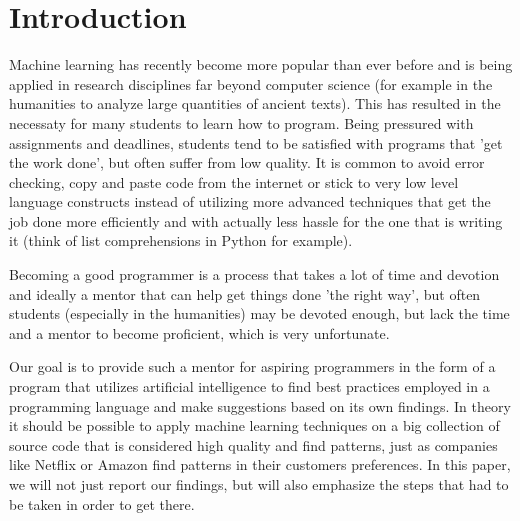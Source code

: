 \section{Introduction}
\label{sec:introduction}

  Machine learning has recently become more popular than ever before and
  is being applied in research disciplines far beyond computer science
  (for example in the humanities to analyze large quantities of ancient
  texts). This has resulted in the necessaty for many students to learn
  how to program. Being pressured with assignments and deadlines, students
  tend to be satisfied with programs that 'get the work done', but often
  suffer from low quality. It is common to avoid error checking, copy
  and paste code from the internet or stick to very low level language
  constructs instead of utilizing more advanced techniques that get the
  job done more efficiently and with actually less hassle for the one
  that is writing it (think of list comprehensions in Python for example).

  Becoming a good programmer is a process that takes a lot of time
  and devotion and ideally a mentor that can help get things done 'the
  right way', but often students (especially in the humanities) may be
  devoted enough, but lack the time and a mentor to become proficient,
  which is very unfortunate.

  Our goal is to provide such a mentor for aspiring programmers in the
  form of a program that utilizes artificial intelligence to find best
  practices employed in a programming language and make suggestions
  based on its own findings. In theory it should be possible to apply
  machine learning techniques on a big collection of source code that
  is considered high quality and find patterns, just as companies like
  Netflix or Amazon find patterns in their customers preferences. In this
  paper, we will not just report our findings, but will also emphasize
  the steps that had to be taken in order to get there.
